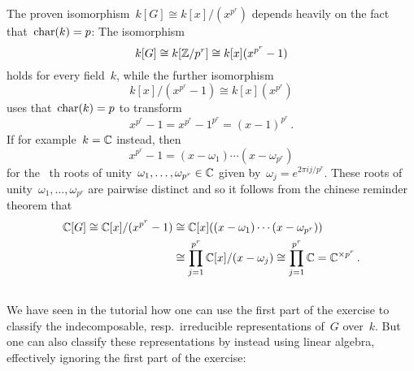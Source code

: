 \section{}





\subsection{}


\begin{remark}
  The proven isomorphism~$k[G] \cong k[x]/(x^{p^r})$ depends heavily on the fact that~$\operatorname{char}(k) = p$:
  The isomorphism
  \[
          k[G]
    \cong k[\mathbb{Z}/p^r]
    \cong k[x](x^{p^r} - 1)
  \]
  holds for every field~$k$, while the further isomorphism
  \[
          k[x]/(x^{p^r} - 1)
    \cong k[x](x^{p^r})
  \]
  uses that~$\operatorname{char}(k) = p$ to transform
  \[
      x^{p^r} - 1
    = x^{p^r} - 1^{p^r}
    = (x - 1)^{p^r} \,.
  \]
  If for example~$k = \mathbb{C}$ instead, then
  \[
      x^{p^r} - 1
    = (x - \omega_1) \dotsm (x - \omega_{p^r})
  \]
  for the~ {th} roots of unity~$\omega_1, \dotsc, \omega_{p^r} \in \mathbb{C}$ given by~$\omega_j = e^{2 \pi i j / p^r}$.
  These roots of unity~$\omega_1, \dotsc, \omega_{p^r}$ are pairwise distinct and so it follows from the chinese reminder theorem that
  \begin{align*}
            \mathbb{C}[G]
    \cong  \mathbb{C}[x]/(x^{p^r} - 1)
    &\cong  \mathbb{C}[x]( (x - \omega_1) \dotsm (x - \omega_{p^r}) ) \\
    &\cong  \prod_{j=1}^{p^r} \mathbb{C}[x]/(x - \omega_j)
    \cong  \prod_{j=1}^{p^r} \mathbb{C}
    =      \mathbb{C}^{\times p^r} \,.
  \end{align*}
\end{remark}







\subsection{}

We have seen in the tutorial how one can use the first part of the exercise to classify the {\fd} indecomposable, resp.\ irreducible representations of~$G$ over~$k$.
But one can also classify these representations by instead using linear algebra, effectively ignoring the first part of the exercise:

